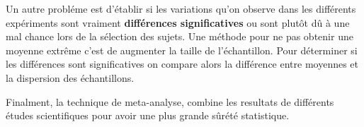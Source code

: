 \begin{itemize}
Un autre probl\'eme est d'\'etablir si les variations qu'on observe dans les diff\'erents exp\'eriments sont vraiment \textbf{diff\'erences significatives} ou sont plut\^ot d\^u \`a une mal chance lors de la s\'election des sujets. Une m\'ethode pour ne pas obtenir une moyenne extr\^eme c'est de augmenter la taille de l'\'echantillon. Pour d\'eterminer si les diff\'erences sont significatives on compare alors la diff\'erence entre moyennes et la dispersion des \'echantillons.

Finalment, la technique de meta-analyse, combine les resultats de diff\'erents \'etudes scientifiques  pour avoir une plus grande s\^ur\'et\'e statistique.
\end{itemize}





































